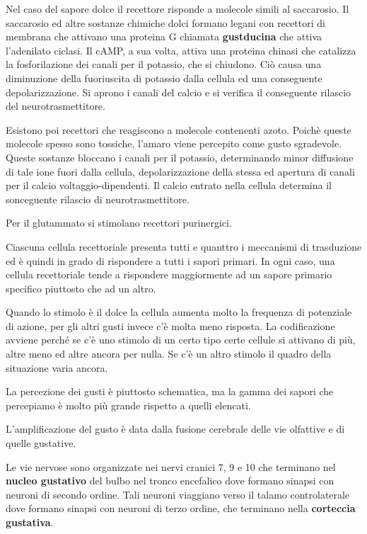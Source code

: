 \documentclass[]{article}
\begin{document}
Nel caso del sapore dolce il recettore risponde a molecole simili al
saccarosio. Il saccarosio ed altre sostanze chimiche dolci formano
legani con recettori di membrana che attivano una proteina G chiamata
\textbf{gustducina} che attiva l'adenilato ciclasi. Il cAMP, a sua
volta, attiva una proteina chinasi che catalizza la fosforilazione dei
canali per il potassio, che si chiudono. Ciò causa una diminuzione della
fuoriuscita di potassio dalla cellula ed una conseguente
depolarizzazione. Si aprono i canali del calcio e si verifica il
conseguente rilascio del neurotrasmettitore.

Esistono poi recettori che reagiscono a molecole contenenti azoto.
Poichè queste molecole spesso sono tossiche, l'amaro viene percepito
come gusto sgradevole. Queste sostanze bloccano i canali per il
potassio, determinando minor diffusione di tale ione fuori dalla
cellula, depolarizzazione della stessa ed apertura di canali per il
calcio voltaggio-dipendenti. Il calcio entrato nella cellula determina
il sonceguente rilascio di neurotrasmettitore.

Per il glutammato si stimolano recettori purinergici.

Ciascuna cellula recettoriale presenta tutti e quanttro i meccanismi di
trasduzione ed è quindi in grado di rispondere a tutti i sapori primari.
In ogni caso, una cellula recettoriale tende a rispondere maggiormente
ad un sapore primario specifico piuttosto che ad un altro.

Quando lo stimolo è il dolce la cellula aumenta molto la frequenza di
potenziale di azione, per gli altri gusti invece c'è molta meno
risposta. La codificazione avviene perché se c'è uno stimolo di un certo
tipo certe cellule si attivano di più, altre meno ed altre ancora per
nulla. Se c'è un altro stimolo il quadro della situazione varia ancora.

La percezione dei gusti è piuttosto schematica, ma la gamma dei sapori
che percepiamo è molto più grande rispetto a quelli elencati.

L'amplificazione del gusto è data dalla fusione cerebrale delle vie
olfattive e di quelle gustative.

Le vie nervose sono organizzate nei nervi cranici 7, 9 e 10 che
terminano nel \textbf{nucleo gustativo} del bulbo nel tronco encefalico
dove formano sinapsi con neuroni di secondo ordine. Tali neuroni
viaggiano verso il talamo controlaterale dove formano sinapsi con
neuroni di terzo ordine, che terminano nella \textbf{corteccia
gustativa}.
\end{document}
